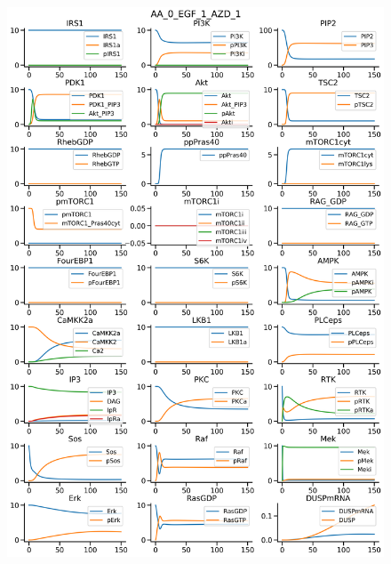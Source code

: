 \documentclass{beamer}
\begin{document}
\begin{frame}
\begin{figure}
\begin{minipage}{0.45\textwidth}
        \includegraphics[width=\textwidth]{../simulations/ExtendedPI3KModel/validations/AAWithEGFWithAZD/AA_0_EGF_1_AZD_1-3.png}
    \end{minipage}
\end{figure}
\end{frame}

\end{document}
